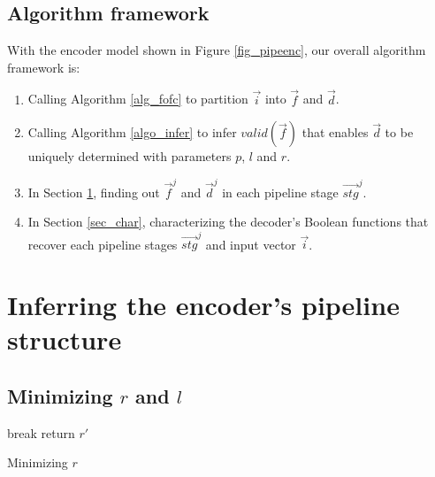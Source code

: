 \documentclass[runningheads,a4paper,orivec]{llncs}
\begin{document}
\subsection{Algorithm framework}

With the encoder model shown in Figure \ref{fig_pipeenc},
our overall algorithm framework is:

\begin{enumerate}
 \item Calling Algorithm \ref{alg_fofc} to partition $\vec{i}$ into $\vec{f}$ and $\vec{d}$.
 \item Calling Algorithm \ref{algo_infer} to infer $valid(\vec{f})$ that enables $\vec{d}$ 
 to be uniquely determined with parameters $p$, $l$ and $r$.
 \item In Section \ref{sec_pipeinfer}, 
 finding out $\vec{f}^j$ and $\vec{d}^j$ in each pipeline stage $\vec{stg}^j$. 
 \item In Section \ref{sec_char}, 
 characterizing the decoder's Boolean functions that recover each pipeline stages $\vec{stg}^j$
 and input vector $\vec{i}$.
\end{enumerate}



\section{Inferring the encoder's pipeline structure}\label{sec_pipeinfer}


\subsection{Minimizing $r$ and $l$}\label{reduceing}

\begin{algorithm}[t]
\SetAlgoVlined
{} {
   {
    break
  }
}
return $r'$
\caption{Minimizing $r$}
\label{algo_remove2}
\end{algorithm}
\end{document}
